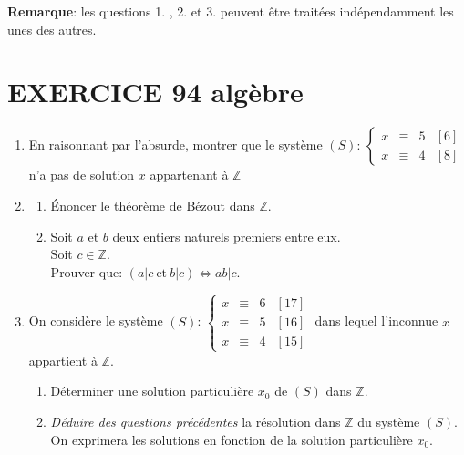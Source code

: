 \documentclass[10pt,oneside]{article}
\begin{document}
\begin{flushleft}
\begin{enumerate}
   \end{enumerate}
   \medskip
  \textbf{ Remarque}: les questions 1. , 2. et 3. peuvent être traitées  indépendamment les unes des autres.
    


\section*{EXERCICE 94 \: algèbre }



\begin{enumerate}
\item  En raisonnant par l'absurde, montrer que le système $(S)$: 
 $\left\{\begin{array}{lccl}
 x&\equiv&5& [6]\\
 x&\equiv&4&[8]
 \end{array}\right.$ n'a pas de solution $x$ appartenant à $\mathbb{Z}$
\item
  \begin{enumerate}
    \item \'Enoncer le théorème de Bézout dans $\mathbb{Z}$.\:\:\:\:
 \item
 Soit $a$ et $b$ deux entiers naturels premiers entre eux. \\
 Soit $c\in \mathbb{Z}$.\\
 \medskip
 Prouver que:  $\left( a|c\:\text{et} \:b|c\right)\Longleftrightarrow ab|c$. \:\:\:\
 \end{enumerate}
 \item 
 On considère le système $(S)$: 
 $\left\{\begin{array}{lccl}
           x&\equiv&6& [17]\\
            x&\equiv&5& [16]\\
 x&\equiv&4&[15]
 \end{array}\right.$ dans lequel l'inconnue $x$ appartient à $\mathbb{Z}$.\\
\begin{enumerate}
\item
Déterminer une solution particulière $x_0$ de $(S)$ dans $\mathbb{Z}$.
\item
\textit{Déduire des questions précédentes} la résolution dans  $\mathbb{Z}$ du système $(S)$.\\
On exprimera les solutions en fonction de la solution particulière $x_0$.\:\:\:\:
\end{enumerate}
\end{enumerate}


\end{flushleft}
\end{document}
